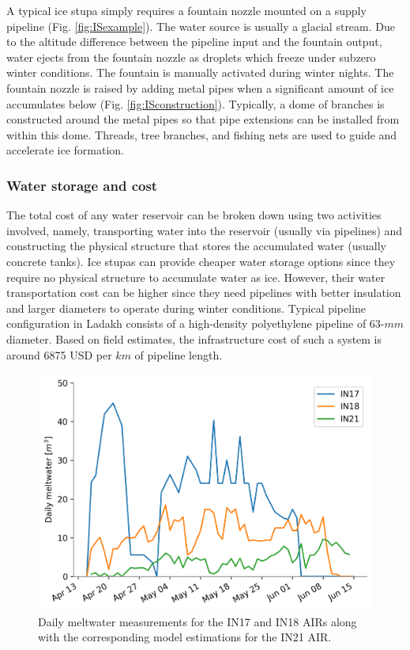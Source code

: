 A typical ice stupa simply requires a fountain nozzle mounted on a supply pipeline (Fig. \ref{fig:ISexample}).
The water source is usually a glacial stream. Due to the altitude difference between the pipeline input and the
fountain output, water ejects from the fountain nozzle as droplets which freeze under subzero winter conditions.
The fountain is manually activated during winter nights. The fountain nozzle is raised by adding
metal pipes when a significant amount of ice accumulates below (Fig. \ref{fig:ISconstruction}). Typically, a dome of
branches is constructed around the metal pipes so that pipe extensions can be installed from within this dome.
Threads, tree branches, and fishing nets are used to guide and accelerate ice formation.

\subsubsection{Water storage and cost}
\label{sec:icestupa_irr}

The total cost of any water reservoir can be broken down using two activities involved, namely, transporting water into the reservoir (usually via pipelines) and constructing the physical structure that stores the accumulated water (usually concrete tanks). Ice stupas can provide cheaper water storage options since they require no physical structure to accumulate water as ice. However, their water transportation cost can be higher since they need pipelines with better insulation and larger diameters to operate during winter conditions. Typical pipeline configuration in Ladakh consists of a high-density polyethylene pipeline of 63-$mm$ diameter. Based on field estimates, the infrastructure cost of such a
system is around 6875 USD per $km$ of pipeline length.


\begin{figure}
	\centering
	\includegraphics[width=\textwidth]{figs/melt.png}
	\caption{Daily meltwater measurements for the IN17 and IN18 \ac{AIRs} along with the corresponding model estimations
		for the IN21 \ac{AIR}. }
	\label{fig:ISmelt}
\end{figure}


